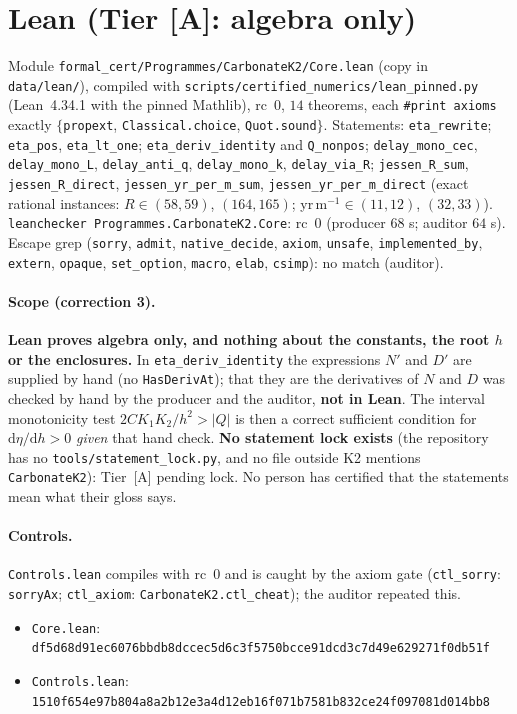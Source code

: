 \documentclass[10pt]{article}
\newcommand{\tier}[1]{\textsf{[#1]}}
\newcommand{\tA}{\tier{A}}
\newcommand{\lean}[1]{\texttt{#1}}
\begin{document}
\section{Lean (Tier \tA{}: algebra only)}\label{sec:lean}
Module \texttt{formal\_cert/Programmes/CarbonateK2/Core.lean} (copy in \texttt{data/lean/}), compiled with \texttt{scripts/certified\_numerics/lean\_pinned.py} (Lean~4.34.1 with the pinned Mathlib), rc~$0$, $14$ theorems, each \texttt{\#print axioms} exactly $\{$\lean{propext}, \lean{Classical.choice}, \lean{Quot.sound}$\}$. Statements: \lean{eta\_rewrite}; \lean{eta\_pos}, \lean{eta\_lt\_one}; \lean{eta\_deriv\_identity} and \lean{Q\_nonpos}; \lean{delay\_mono\_cec}, \lean{delay\_mono\_L}, \lean{delay\_anti\_q}, \lean{delay\_mono\_k}, \lean{delay\_via\_R}; \lean{jessen\_R\_sum}, \lean{jessen\_R\_direct}, \lean{jessen\_yr\_per\_m\_sum}, \lean{jessen\_yr\_per\_m\_direct} (exact rational instances: $R\in(58,59)$, $(164,165)$; yr\,m$^{-1}\in(11,12)$, $(32,33)$). \texttt{leanchecker Programmes.CarbonateK2.Core}: rc~$0$ (producer $68$ s; auditor $64$ s). Escape grep (\lean{sorry}, \lean{admit}, \lean{native\_decide}, \lean{axiom}, \lean{unsafe}, \lean{implemented\_by}, \lean{extern}, \lean{opaque}, \lean{set\_option}, \lean{macro}, \lean{elab}, \lean{csimp}): no match (auditor).
\paragraph{Scope (correction 3).} \textbf{Lean proves algebra only, and nothing about the constants, the root $h$ or the enclosures.} In \lean{eta\_deriv\_identity} the expressions $N'$ and $D'$ are supplied by hand (no \lean{HasDerivAt}); that they are the derivatives of $N$ and $D$ was checked by hand by the producer and the auditor, \textbf{not in Lean}. The interval monotonicity test $2CK_1K_2/h^2>|Q|$ is then a correct sufficient condition for $\mathrm d\eta/\mathrm dh>0$ \emph{given} that hand check. \textbf{No statement lock exists} (the repository has no \texttt{tools/statement\_lock.py}, and no file outside K2 mentions \texttt{CarbonateK2}): Tier~\tA{} pending lock. No person has certified that the statements mean what their gloss says.
\paragraph{Controls.} \texttt{Controls.lean} compiles with rc~$0$ and is caught by the axiom gate (\lean{ctl\_sorry}: \lean{sorryAx}; \lean{ctl\_axiom}: \lean{CarbonateK2.ctl\_cheat}); the auditor repeated this.
\begin{itemize}\scriptsize\itemsep=0pt
\item \texttt{Core.lean}: \texttt{df5d68d91ec6076bbdb8dccec5d6c3f5750bcce91dcd3c7d49e629271f0db51f}
\item \texttt{Controls.lean}: \texttt{1510f654e97b804a8a2b12e3a4d12eb16f071b7581b832ce24f097081d014bb8}
\end{itemize}
\end{document}
